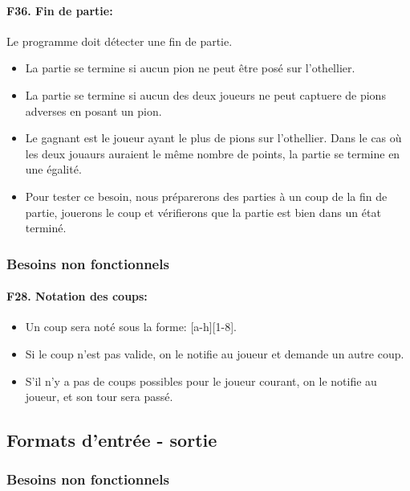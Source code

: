 \documentclass[a4paper,12pt]{article}
\begin{document}
\paragraph{F36. Fin de partie:} Le programme doit détecter une fin de partie.
\begin{itemize}
  \item La partie se termine si aucun pion ne peut être posé sur l'othellier.
  \item La partie se termine si aucun des deux joueurs ne peut captuere de pions
        adverses en posant un pion.
  \item Le gagnant est le joueur ayant le plus de pions sur l'othellier. Dans le cas où
        les deux jouaurs auraient le même nombre de points, la partie se termine en une
        égalité.
  \item Pour tester ce besoin, nous préparerons des parties à un coup de la fin de
        partie, jouerons le coup et vérifierons que la partie est bien dans un état
        terminé.
\end{itemize}

\subsubsection{Besoins non fonctionnels}

\paragraph{F28. Notation des coups:}
\begin{itemize}
  \item Un coup sera noté sous la forme: [a-h][1-8].
  \item Si le coup n'est pas valide, on le notifie au joueur et demande un autre coup.
  \item S'il n'y a pas de coups possibles pour le joueur courant, on le notifie au
        joueur, et son tour sera passé.
\end{itemize}

\subsection{Formats d'entrée - sortie}

\subsubsection{Besoins non fonctionnels}
\end{document}
